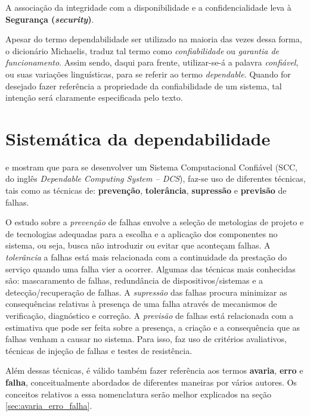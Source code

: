A associação da integridade com a disponibilidade e a confidencialidade leva à
\textbf{Segurança (\textit{security})}.

Apesar do termo dependabilidade ser utilizado na maioria das vezes dessa forma,
o dicionário Michaelis, traduz tal termo como {\it confiabilidade} ou {\it
garantia de funcionamento}. Assim sendo, daqui para frente, utilizar-se-á a
palavra {\it confiável}, ou suas variações linguísticas, para se referir ao
termo {\it dependable}. Quando for desejado fazer referência a propriedade da
confiabilidade de um sistema, tal intenção será claramente especificada pelo
texto.

\section{Sistemática da dependabilidade}
 e  mostram que para se
desenvolver um Sistema Computacional Confiável (SCC, do inglês {\it Dependable
Computing System -- DCS}), faz-se uso de diferentes técnicas, tais como as
técnicas de: {\bf prevenção}, {\bf tolerância}, {\bf supressão} e {\bf previsão}
de falhas.

O estudo sobre a {\it prevenção} de falhas envolve a seleção de metologias de
projeto e de tecnologias adequadas para a escolha e a aplicação dos componentes
no sistema, ou seja, busca não introduzir ou evitar que aconteçam falhas. A {\it
tolerância} a falhas está mais relacionada com a continuidade da prestação do
serviço quando uma falha vier a ocorrer. Algumas das técnicas mais conhecidas
são: mascaramento de falhas, redundância de dispositivos/sistemas e a
detecção/recuperação de falhas. A {\it supressão} das falhas procura minimizar
as consequências relativas à presença de uma falha através de mecanismos de
verificação, diagnóstico e correção. A {\it previsão} de falhas está relacionada
com a estimativa que pode ser feita sobre a presença, a criação e a consequência
que as falhas venham a causar no sistema. Para isso, faz uso de critérios
avaliativos, técnicas de injeção de falhas e testes de resistência.

Além dessas técnicas, é válido também fazer referência aos termos {\bf avaria},
{\bf erro} e {\bf falha}, conceitualmente abordados de diferentes maneiras por
vários autores. Os conceitos relativos a essa nomenclatura serão melhor
explicados na seção \ref{sec:avaria_erro_falha}.

